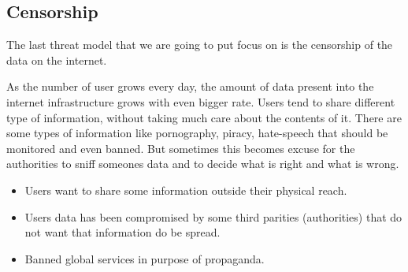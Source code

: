 \subsection{Censorship}
The last threat model that we are going to put focus on is the censorship of the data on the internet.

As the number of user grows every day, the amount of data present into the internet infrastructure grows with even bigger rate. Users tend to share different type of information, without taking much care about the contents of it. There are some types of information like pornography, piracy, hate-speech  that should be monitored and even banned. But sometimes this becomes excuse for the authorities to sniff someones data and to decide what is right and what is wrong.

\begin{itemize}
  \item Users want to share some information outside their physical reach.
  \item Users data has been compromised by some third parities (authorities) that do not want that information do be spread.
  \item Banned global services in purpose of propaganda.
\end{itemize}
